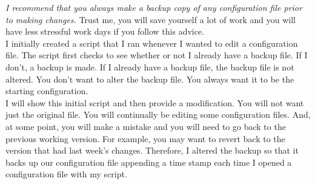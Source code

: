 \textit{I recommend that you always make a backup copy of any configuration file prior to making changes.} Trust me, you will save yourself a lot of work and you will have less stressful work days if you follow this advice.\\

 I initially created a script that I ran whenever I wanted to edit a configuration file. The script first checks to see whether or not I already have a backup file. If I don't, a backup is made. If I already have a backup file, the backup file is not altered. You don't want to alter the backup file. You always want it to be the starting configuration.\\
 
 I will show this initial script and then provide a modification. You will not want just the original file. You will continually be editing some configuration files. And, at some point, you will make a mistake and you will need to go back to the previous working version. For example, you may want to revert back to the version that had last week's changes. Therefore, I altered the backup so that it backs up our configuration file appending a time stamp each time I opened a configuration file with my script.

